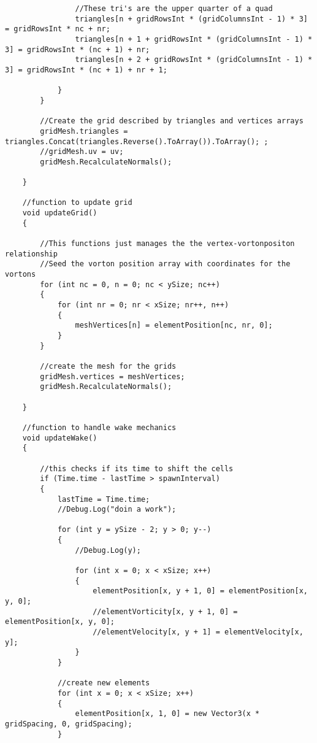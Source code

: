 \begin{mdframed}[linecolor=black, topline=true, bottomline=true,
  leftline=false, rightline=false]
\begin{verbatim}
                //These tri's are the upper quarter of a quad
                triangles[n + gridRowsInt * (gridColumnsInt - 1) * 3] = gridRowsInt * nc + nr;
                triangles[n + 1 + gridRowsInt * (gridColumnsInt - 1) * 3] = gridRowsInt * (nc + 1) + nr;
                triangles[n + 2 + gridRowsInt * (gridColumnsInt - 1) * 3] = gridRowsInt * (nc + 1) + nr + 1;

            }
        }

        //Create the grid described by triangles and vertices arrays
        gridMesh.triangles = triangles.Concat(triangles.Reverse().ToArray()).ToArray(); ;
        //gridMesh.uv = uv;
        gridMesh.RecalculateNormals();

    }

    //function to update grid 
    void updateGrid()
    {

        //This functions just manages the the vertex-vortonpositon relationship
        //Seed the vorton position array with coordinates for the vortons
        for (int nc = 0, n = 0; nc < ySize; nc++)
        {
            for (int nr = 0; nr < xSize; nr++, n++)
            {
                meshVertices[n] = elementPosition[nc, nr, 0];
            }
        }

        //create the mesh for the grids
        gridMesh.vertices = meshVertices;
        gridMesh.RecalculateNormals();

    }

    //function to handle wake mechanics
    void updateWake()
    {

        //this checks if its time to shift the cells
        if (Time.time - lastTime > spawnInterval)
        {
            lastTime = Time.time;
            //Debug.Log("doin a work");

            for (int y = ySize - 2; y > 0; y--)
            {
                //Debug.Log(y);
                
                for (int x = 0; x < xSize; x++)
                {
                    elementPosition[x, y + 1, 0] = elementPosition[x, y, 0];
                    //elementVorticity[x, y + 1, 0] = elementPosition[x, y, 0];
                    //elementVelocity[x, y + 1] = elementVelocity[x, y];
                }
            }

            //create new elements
            for (int x = 0; x < xSize; x++)
            {
                elementPosition[x, 1, 0] = new Vector3(x * gridSpacing, 0, gridSpacing);
            }


\end{verbatim}
\end{mdframed}

